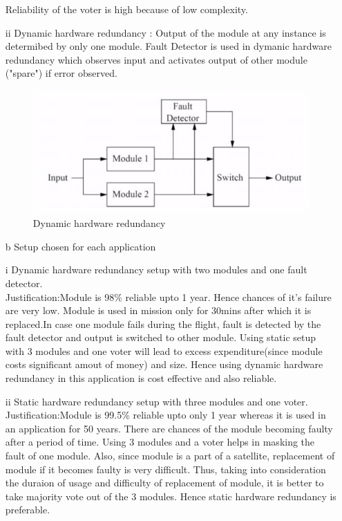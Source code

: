 \documentclass[]{article}
\begin{document}
\begin{itemize}
		
		Reliability of the voter is high because of low complexity.
		\item[ii] Dynamic hardware redundancy : Output of the module at any instance is determibed by only one module. Fault Detector is used in dymanic hardware redundancy which observes input and activates output of other module ("spare") if error observed.
		\begin{figure}[h]
			\centering
			\includegraphics{Dynamic}  
			\caption{Dynamic hardware redundancy}
		\end{figure}
		\item[b] Setup chosen for each application
		\item[i]Dynamic hardware redundancy setup with two modules and one fault detector.\\Justification:Module is 98\% reliable upto 1 year. Hence chances of it's failure are very low. Module is used in mission only for 30mins after which it is replaced.In case one module fails  during the flight, fault is detected by the fault detector and output is switched to other module. Using static setup with 3 modules and one voter will lead to excess expenditure(since module costs significant amout of money) and size. Hence using dynamic hardware redundancy in this application is cost effective and also reliable.
		\item[ii]Static hardware redundancy setup with three modules and one voter.\\Justification:Module is 99.5\% reliable upto only 1 year whereas it is used in an application for 50 years. There are chances of the module becoming faulty after a period of time. Using 3 modules and a voter helps in masking the fault of one module. Also, since module is a part of a satellite, replacement of module if it becomes faulty is very difficult. Thus, taking into consideration the duraion of usage and difficulty of replacement of module, it is better to take majority vote out of the 3 modules. Hence static hardware redundancy is preferable.

\end{itemize}
\end{document}
